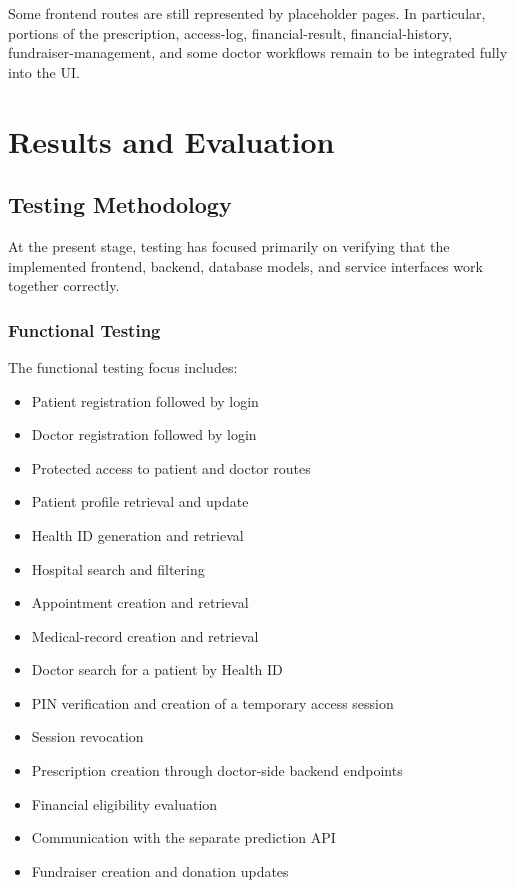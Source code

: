 \documentclass{tietreport}
\begin{document}
Some frontend routes are still represented by placeholder pages. In
particular, portions of the prescription, access-log, financial-result,
financial-history, fundraiser-management, and some doctor workflows
remain to be integrated fully into the UI.


\chapter{Results and Evaluation}

\section{Testing Methodology}

At the present stage, testing has focused primarily on verifying that
the implemented frontend, backend, database models, and service
interfaces work together correctly.

\subsection{Functional Testing}

The functional testing focus includes:

\begin{itemize}
  \item Patient registration followed by login
  \item Doctor registration followed by login
  \item Protected access to patient and doctor routes
  \item Patient profile retrieval and update
  \item Health ID generation and retrieval
  \item Hospital search and filtering
  \item Appointment creation and retrieval
  \item Medical-record creation and retrieval
  \item Doctor search for a patient by Health ID
  \item PIN verification and creation of a temporary access session
  \item Session revocation
  \item Prescription creation through doctor-side backend endpoints
  \item Financial eligibility evaluation
  \item Communication with the separate prediction API
  \item Fundraiser creation and donation updates
\end{itemize}
\end{document}
